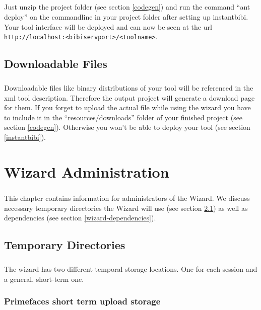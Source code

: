 \documentclass[a4paper,10pt]{book}
\begin{document}
\paragraph{} Just unzip the project folder (see section \ref{codegen}) and run the command ``ant deploy'' on the commandline in your project folder after setting up instantbibi. Your tool interface will be deployed and can now be seen at the url \verb+http://localhost:<bibiservport>/<toolname>+.

\section{Downloadable Files}
\label{downloadables}
\paragraph{} Downloadable files like binary distributions of your tool will be referenced in the xml tool description. Therefore the output project will generate a download page for them. If you forget to upload the actual file while using the wizard you have to include it in the ``resources/downloads'' folder of your finished project (see section \ref{codegen}). Otherwise you won't be able to deploy your tool (see section \ref{instantbibi}).

\chapter{Wizard Administration}
\label{admin}
\paragraph{} This chapter contains information for administrators of the Wizard. We discuss necessary temporary directories the Wizard will use (see section \ref{temp}) as well as dependencies (see section \ref{wizard-dependencies}).

\section{Temporary Directories}
\label{temp}
\paragraph{} The wizard has two different temporal storage locations. One for each session and a general, short-term one.
\subsection{Primefaces short term upload storage}
\end{document}
